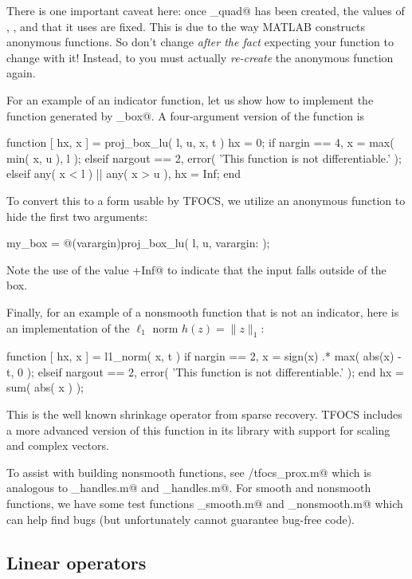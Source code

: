 \documentclass{article}
\newcommand{\<}{\langle}
\renewcommand{\>}{\rangle}
\begin{document}
There is
one important caveat here: once \verb@my_quad@ has been created, the
values of \verb@P@, \verb@q@, and \verb@r@ that it uses are fixed.
This is due to the way MATLAB constructs anonymous functions. So
don't change \verb@P@ \emph{after the fact} expecting your function
to change with it! Instead, to you must actually
\emph{re-create} the anonymous function again.

For an example of an indicator function, let us show how to implement the
function generated by \verb@proj_box@. A four-argument version of
the function is
\begin{code}	
	function [ hx, x ] = proj_box_lu( l, u, x, t )
	hx = 0;
	if nargin == 4,
	    x = max( min( x, u ), l );
	elseif nargout == 2,
	    error( 'This function is not differentiable.' );
	elseif any( x < l ) || any( x > u ),
	    hx = Inf;
	end
\end{code}
To convert this to a form usable by TFOCS, we utilize an anonymous
function to hide the first two arguments:
\begin{code}
	my_box = @(varargin)proj_box_lu( l, u, varargin{:} );
\end{code}
Note the use of the value \verb@+Inf@ to indicate that the
input \verb@x@ falls outside of the box.

Finally, for an example of a nonsmooth function that is not
an indicator, here is an implementation of the $\ell_1$ norm 
$h(z)=\|z\|_1$:
\begin{code}
	function [ hx, x ] = l1_norm( x, t )
	if nargin == 2,
	    x  = sign(x) .* max( abs(x) - t, 0 );
	elseif nargout == 2,
	    error( 'This function is not differentiable.' );
	end		
	hx = sum( abs( x ) );
\end{code}
This is the well known shrinkage operator from sparse recovery.
TFOCS includes a more advanced version of this function in its
library with support for scaling and complex vectors.

To assist with building nonsmooth functions, see \verb@private/tfocs_prox.m@ which
is analogous to \verb@linop_handles.m@ and \verb@smooth_handles.m@.
For smooth and nonsmooth functions, we have some test functions \verb@test_smooth.m@ and
\verb@test_nonsmooth.m@ which can help find bugs (but unfortunately cannot guarantee
bug-free code).

\subsection{Linear operators}
\label{sec:linear}
\end{document}

